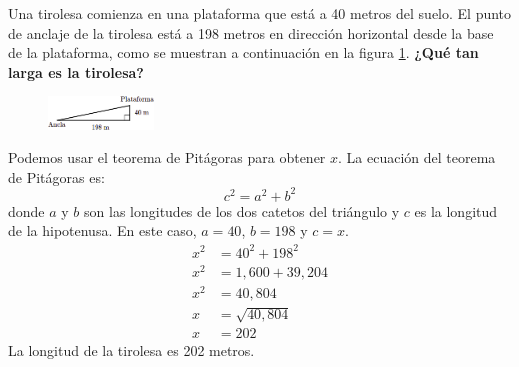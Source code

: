 Una tirolesa comienza en una plataforma que está a 40 metros del suelo.
El punto de anclaje de la tirolesa está a 198 metros en dirección horizontal desde la base de la plataforma, como se muestran a continuación en la figura \ref{fig:proverb_pitagoras_03}.
\textbf{¿Qué tan larga es la tirolesa?}

\begin{figure}[H]
    \centering
    \includegraphics[width=0.25\textwidth]{../images/proverb_pitagoras_03.png}
    \caption{}
    \label{fig:proverb_pitagoras_03}
\end{figure}


\begin{solutionbox}{7cm}
    Podemos usar el teorema de Pitágoras para obtener $x$.
    La ecuación del teorema de Pitágoras es:
    \[c^2=a^2+b^2\]
    donde $a$ y $b$ son las longitudes de los dos catetos del triángulo y $c$ es la longitud de la hipotenusa.
    En este caso, $a=40$, $b=198$ y $c=x$.
    \begin{align*}
        x^2 & =40^2+198^2     \\
        x^2 & =1,600 + 39,204 \\
        x^2 & =40,804         \\
        x   & =\sqrt{40,804}  \\
        x   & = 202
    \end{align*}
    La longitud de la tirolesa es 202 metros.
\end{solutionbox}